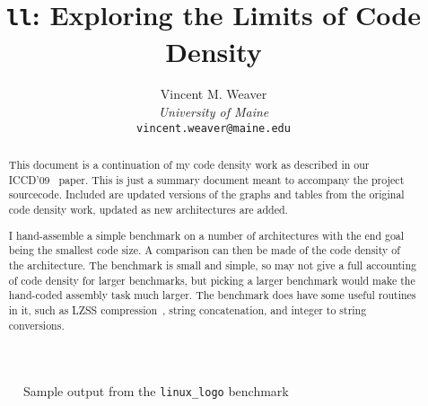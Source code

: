 \documentclass{article}[10pt]
\begin{document}

\title{\LARGE \bf
{\tt ll}: Exploring the Limits of Code Density
}

\author{ \parbox{3 in}{\centering Vincent M. Weaver\\
         \textit{University of Maine}\\
         {\tt vincent.weaver@maine.edu}}
}

\maketitle

\begin{abstract}
This document is a continuation of my code density work as described
in our ICCD'09~\cite{weaver+:iccd09} paper.  
This is just a summary document meant to accompany the project sourcecode.  
Included are updated versions of the graphs and tables from the original
code density work, updated as new architectures are added.

I hand-assemble a simple benchmark on a number of architectures with
the end goal being the smallest code size.  
A comparison can then be made of the code density of the architecture.  
The benchmark is small and simple, so may not give a full accounting of 
code density for larger benchmarks, but picking a larger benchmark would 
make the hand-coded assembly task much larger.  
The benchmark does have some useful routines in it, such as 
LZSS compression~\cite{ziv+:lz77,storer+:lzss82}, 
string concatenation, and integer to string conversions.

\end{abstract}

\begin{figure}[tbp]
  \centering
  \caption{Sample output from the {\tt linux\_logo} benchmark}
  \label{figure:ll}
\end{figure}

%
%

\noindent



\end{document}
